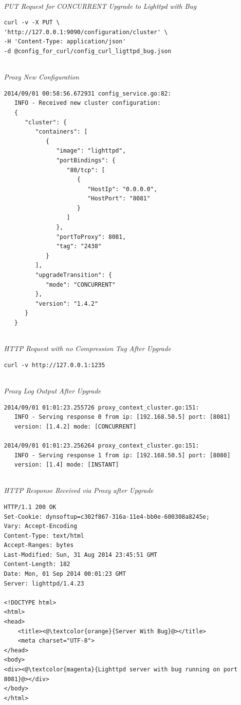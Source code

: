 \documentclass[a4paper,11pt,twoside]{report}
\begin{document}
\noindent\\
\textit{PUT Request for CONCURRENT Upgrade to Lighttpd with Bug}
\begin{lstlisting}[language=terminal]
curl -v -X PUT \
'http://127.0.0.1:9090/configuration/cluster' \
-H 'Content-Type: application/json' 
-d @config_for_curl/config_curl_ligttpd_bug.json
\end{lstlisting}  

\noindent\\
\textit{Proxy New Configuration}
\begin{lstlisting}[language=terminal]
2014/09/01 00:58:56.672931 config_service.go:82:     
   INFO - Received new cluster configuration:
   {
      "cluster": {
         "containers": [
            {
               "image": "lighttpd",
               "portBindings": {
                  "80/tcp": [
                     {
                        "HostIp": "0.0.0.0",
                        "HostPort": "8081"
                     }
                  ]
               },
               "portToProxy": 8081,
               "tag": "2438"
            }
         ],
         "upgradeTransition": {
            "mode": "CONCURRENT"
         },
         "version": "1.4.2"
      }
   }
\end{lstlisting} 

\noindent \\
\textit{HTTP Request with no Compression Tag After Upgrade} 
\begin{lstlisting}[language=terminal]
curl -v http://127.0.0.1:1235
\end{lstlisting}  

\noindent \\
\textit{Proxy Log Output After Upgrade}
\begin{lstlisting}[language=terminal]
2014/09/01 01:01:23.255726 proxy_context_cluster.go:151:     
   INFO - Serving response 0 from ip: [192.168.50.5] port: [8081] 
   version: [1.4.2] mode: [CONCURRENT]
   
2014/09/01 01:01:23.256264 proxy_context_cluster.go:151:     
   INFO - Serving response 1 from ip: [192.168.50.5] port: [8080] 
   version: [1.4] mode: [INSTANT]
\end{lstlisting} 

\noindent\\
\textit{HTTP Response Received via Proxy after Upgrade}  
\begin{lstlisting}[language=terminal]
HTTP/1.1 200 OK
Set-Cookie: dynsoftup=c302f867-316a-11e4-bb0e-600308a8245e;
Vary: Accept-Encoding
Content-Type: text/html
Accept-Ranges: bytes
Last-Modified: Sun, 31 Aug 2014 23:45:51 GMT
Content-Length: 182
Date: Mon, 01 Sep 2014 00:01:23 GMT
Server: lighttpd/1.4.23

<!DOCTYPE html>
<html>
<head>
    <title><@\textcolor{orange}{Server With Bug}@></title>
    <meta charset="UTF-8">
</head>
<body>
<div><@\textcolor{magenta}{Lighttpd server with bug running on port 8081}@></div>
</body>
</html>
\end{lstlisting} 
\end{document}
